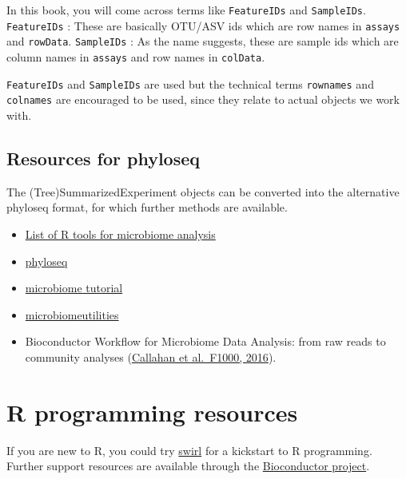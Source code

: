 \documentclass[
]{book}
\providecommand{\tightlist}{%
  \setlength{\itemsep}{0pt}\setlength{\parskip}{0pt}}
\begin{document}
In this book, you will come across terms like \texttt{FeatureIDs} and
\texttt{SampleIDs}. \texttt{FeatureIDs} : These are basically OTU/ASV ids which are
row names in \texttt{assays} and \texttt{rowData}. \texttt{SampleIDs} : As the name
suggests, these are sample ids which are column names in \texttt{assays} and
row names in \texttt{colData}.

\texttt{FeatureIDs} and \texttt{SampleIDs} are used but the technical terms
\texttt{rownames} and \texttt{colnames} are encouraged to be used, since they relate
to actual objects we work with.

\hypertarget{resources-for-phyloseq}{%
\subsection{Resources for phyloseq}\label{resources-for-phyloseq}}

The (Tree)SummarizedExperiment objects can be converted into the alternative phyloseq format, for which further methods are available.

\begin{itemize}
\tightlist
\item
  \href{https://microsud.github.io/Tools-Microbiome-Analysis/}{List of R tools for microbiome analysis}
\item
  \href{http://journals.plos.org/plosone/article?id=10.1371/journal.pone.0061217}{phyloseq}
\item
  \href{http://microbiome.github.io/tutorials/}{microbiome tutorial}
\item
  \href{https://microsud.github.io/microbiomeutilities/}{microbiomeutilities}
\item
  Bioconductor Workflow for Microbiome Data Analysis: from raw reads to community analyses (\href{https://f1000research.com/articles/5-1492/v2}{Callahan et al.~F1000, 2016}).
\end{itemize}

\hypertarget{r-programming-resources}{%
\section{R programming resources}\label{r-programming-resources}}

If you are new to R, you could try \href{https://swirlstats.com/}{swirl}
for a kickstart to R programming. Further support resources are
available through the \href{http://bioconductor.org/}{Bioconductor
project}.
\end{document}
